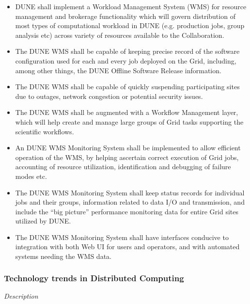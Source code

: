 \begin{itemize}
	\item DUNE  shall implement a Workload Management System (WMS) for resource management and brokerage functionality 
	which will govern  distribution of most types of computational workload in DUNE (e.g. production jobs, group analysis etc) 
	across variety of resources available to the Collaboration.
	
	\item The DUNE WMS shall be capable of keeping precise record of the software configuration used for each and every job deployed on the Grid, including, among other things, the DUNE Offline Software Release information.
	
	\item The DUNE WMS shall be capable of quickly suspending participating sites due to outages, network congestion or potential security issues.
	
	\item The DUNE WMS shall be augmented with a Workflow Management layer, which will help create and manage large groups of Grid tasks supporting the scientific workflows.
	
	\item An DUNE WMS Monitoring System shall be implemented to allow efficient operation of the WMS, by helping ascertain correct execution of Grid jobs, accounting of resource utilization, identification and debugging of failure modes etc.
	
	\item The DUNE WMS Monitoring System shall keep status records for individual jobs and their groups, information related to data I/O and transmission, and include the ``big picture'' performance monitoring data for entire Grid sites utilized by DUNE.
	
	\item The DUNE WMS Monitoring System shall have interfaces conducive to integration with both Web UI for users and operators, and with automated systems needing the WMS data.
\end{itemize}

\subsubsection{Technology trends in Distributed Computing}
\textit{Description}

